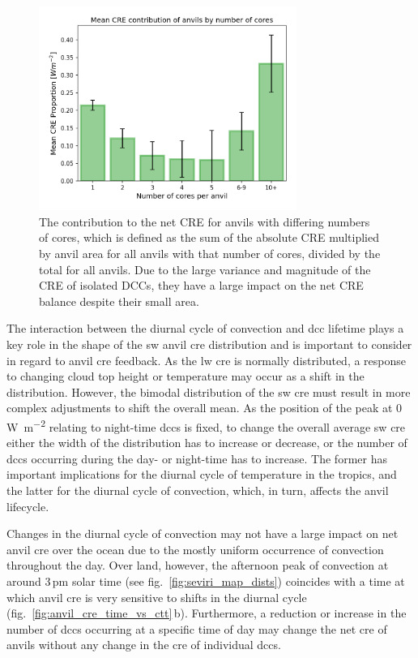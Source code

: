 \begin{figure}[tp]
    \centering
    \includegraphics[width=0.75\textwidth]{figures/chapter4_17.png}
    \caption[
    The contribution to the net CRE for anvils with differing numbers of cores
    ]{
    The contribution to the net CRE for anvils with differing numbers of cores, which is defined as the sum of the absolute CRE multiplied by anvil area for all anvils with that number of cores, divided by the total for all anvils. Due to the large variance and magnitude of the CRE of isolated DCCs, they have a large impact on the net CRE balance despite their small area. 
    }
    \label{fig:S_contribution_to_net_cre}
\end{figure}

The interaction between the diurnal cycle of convection and \acrshort{dcc} lifetime plays a key role in the shape of the \acrshort{sw} anvil \acrshort{cre} distribution and is important to consider in regard to anvil \acrshort{cre} feedback. 
As the \acrshort{lw} \acrshort{cre} is normally distributed, a response to changing cloud top height or temperature may occur as a shift in the distribution. 
However, the bimodal distribution of the \acrshort{sw} \acrshort{cre} must result in more complex adjustments to shift the overall mean. 
As the position of the peak at 0 \,\unit{W m^{-2}} relating to night-time \acrshort{dcc}s is fixed, to change the overall average \acrshort{sw} \acrshort{cre} either the width of the distribution has to increase or decrease, or the number of \acrshort{dcc}s occurring during the day- or night-time has to increase. 
The former has important implications for the diurnal cycle of temperature in the tropics, and the latter for the diurnal cycle of convection, which, in turn, affects the anvil lifecycle.

Changes in the diurnal cycle of convection may not have a large impact on net anvil \acrshort{cre} over the ocean due to the mostly uniform occurrence of convection throughout the day.
Over land, however, the afternoon peak of convection at around 3\,pm solar time (see fig.~\ref{fig:seviri_map_dists}) coincides with a time at which anvil \acrshort{cre} is very sensitive to shifts in the diurnal cycle (fig.~\ref{fig:anvil_cre_time_vs_ctt}\,b).
Furthermore, a reduction or increase in the number of \acrshort{dcc}s occurring at a specific time of day may change the net \acrshort{cre} of anvils without any change in the \acrshort{cre} of individual \acrshort{dcc}s.

